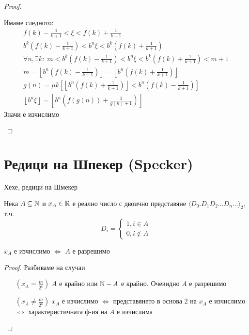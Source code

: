 \begin{proof}
\begin{itemize}
\begin{enumerate}
            Имаме следното:
            \begin{equation*}
                \begin{split}
                    f(k) - \frac{1}{k+1} < \xi < f(k) + \frac{1}{k+1}\\
                    b^k(f(k) - \frac{1}{k+1}) < b^n\xi < b^k(f(k) + \frac{1}{k+1}) \\
                    \forall n, \exists k:\; m < b^k(f(k) - \frac{1}{k+1}) < b^n\xi < b^k(f(k) + \frac{1}{k+1}) < m+1 \\
                    m = \left\lfloor b^n \left(f(k) - \frac{1}{k+1}\right)\right\rfloor = \left\lfloor b^n \left(f(k) + \frac{1}{k+1}\right)\right\rfloor\\
                    g(n) = \mu k \left[ \left\lfloor b^n \left(f(k) + \frac{1}{k+1}\right)\right\rfloor < b^n \left(f(k) - \frac{1}{k+1}\right) \right]\\
                    \left\lfloor b^n \xi \right\rfloor = \left\lfloor b^n\left(f(g(n)) + \frac{1}{g(n) + 1}\right)\right\rfloor
                \end{split}
            \end{equation*}
            Значи е изчислимо
        \end{enumerate}
    \end{itemize}
\end{proof}

\section{Редици на Шпекер (Specker)}
Хехе, редици на Шмекер

Нека $A \subseteq {\mathbb{N}}$ и $x_A \in {\mathbb{R}}$ е реално число с двоично представяне $\langle D_0.D_1 D_2 \dots D_n \dots \rangle_2$, т.ч.
\begin{equation*}
    D_i = \begin{cases}
        1, i \in A \\
        0, i \notin A
    \end{cases}
\end{equation*}
\begin{proposition}
    $x_A$ е изчислимо $\iff$ $A$ е разрешимо
\end{proposition}
\begin{proof}
    Разбиваме на случаи
    \begin{itemize}
        \item[$(x_A = \frac{m}{2^k})$] $A$ е крайно или ${\mathbb{N}} - A$ е крайно. Очевидно $A$ е разрешимо
        \item[$(x_A \neq \frac{m}{2^k})$] $x_A$ е изчислимо $\iff$ представянето в основа 2 на $x_A$ е изчислимо $\iff$ характеристичната ф-ия на $A$ е изчислима
    \end{itemize}
\end{proof}

